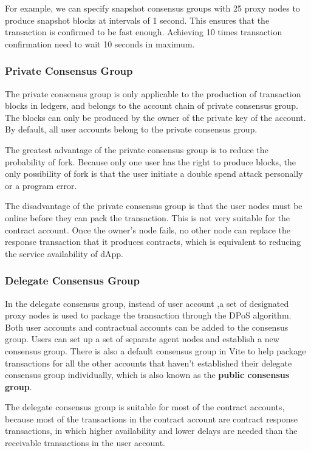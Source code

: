 \documentclass[UTF8,nofonts]{article}
\begin{document}
\begin{multicols}{2}
For example, we can specify snapshot consensus groups with 25 proxy nodes to produce snapshot blocks at intervals of 1 second. This ensures that the transaction is confirmed to be fast enough. Achieving 10 times transaction confirmation need to wait 10 seconds in maximum.

\subsubsection{Private Consensus Group}
The private consensus group is only applicable to the production of transaction blocks in ledgers, and belongs to the account chain of private consensus group. The blocks can only be produced by the owner of the private key of the account. By default, all user accounts belong to the private consensus group. 

The greatest advantage of the private consensus group is to reduce the probability of fork. Because only one user has the right to produce blocks, the only possibility of fork is that the user initiate a double spend attack personally or a program error.

The disadvantage of the private consensus group is that the user nodes must be online before they can pack the transaction. This is not very suitable for the contract account. Once the owner's node fails, no other node can replace the response transaction that it produces contracts, which is equivalent to reducing the service availability of dApp.

\subsubsection{Delegate Consensus Group}
In the delegate consensus group, instead of user account ,a set of designated proxy nodes is used to package the transaction through the DPoS algorithm. Both user accounts and contractual accounts can be added to the consensus group. Users can set up a set of separate agent nodes and establish a new consensus group. There is also a default consensus group in Vite to help package transactions for all the other accounts that haven’t established their delegate consensus group individually, which is also known as the \textbf {public consensus group}.

The delegate consensus group is suitable for most of the contract accounts, because most of the transactions in the contract account are contract response transactions, in which higher availability and lower delays are needed than the receivable transactions in the user account.


\end{multicols}
\end{document}
